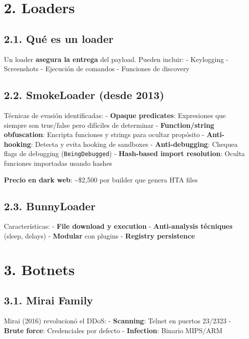 \documentclass[
  letterpaper,
]{report}
\begin{document}
\section{2. Loaders}\label{loaders}

\subsection{2.1. Qué es un loader}\label{quuxe9-es-un-loader}

Un loader \textbf{asegura la entrega} del payload. Pueden incluir: -
Keylogging - Screenshots - Ejecución de comandos - Funciones de
discovery

\subsection{2.2. SmokeLoader (desde 2013)}\label{smokeloader-desde-2013}

Técnicas de evasión identificadas: - \textbf{Opaque predicates}:
Expresiones que siempre son true/false pero difíciles de determinar -
\textbf{Function/string obfuscation}: Encripta funciones y strings para
ocultar propósito - \textbf{Anti-hooking}: Detecta y evita hooking de
sandboxes - \textbf{Anti-debugging}: Chequea flags de debugging
(\texttt{BeingDebugged}) - \textbf{Hash-based import resolution}: Oculta
funciones importadas usando hashes

\textbf{Precio en dark web}: \textasciitilde\$2,500 por builder que
genera HTA files

\subsection{2.3. BunnyLoader}\label{bunnyloader}

Características: - \textbf{File download y execution} -
\textbf{Anti-analysis técniques} (sleep, delays) - \textbf{Modular} con
plugins - \textbf{Registry persistence}

\section{3. Botnets}\label{botnets}

\subsection{3.1. Mirai Family}\label{mirai-family}

Mirai (2016) revolucionó el DDoS: - \textbf{Scanning}: Telnet en puertos
23/2323 - \textbf{Brute force}: Credenciales por defecto -
\textbf{Infection}: Binario MIPS/ARM
\end{document}
